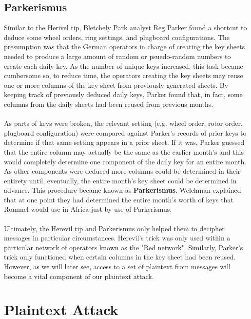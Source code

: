 \subsection{Parkerismus}
Similar to the Herivel tip, Bletchely Park analyst Reg Parker found a
shortcut to deduce some wheel orders, ring settings, and plugboard
configurations. The presumption was that the German operators in
charge of creating the key sheets needed to produce a large amount of
random or psuedo-random numbers to create each daily key. As the
number of unique keys increased, this task became cumbersome so, to
reduce time, the operators creating the key sheets may reuse one or
more columns of the key sheet from previously generated sheets. By
keeping track of previously deduced daily keys, Parker found that, in
fact, some columns from the daily sheets had been reused from
previous months.
\\\\As parts of keys were broken, the relevant setting
(e.g. wheel order, rotor order, plugboard configuration) were compared
against Parker's records of prior keys to determine if that same
setting appears in a prior sheet. If it was, Parker guessed that the
entire column may actually be the same as the earlier month's and
this would completely determine one component of the daily key for an
entire month. As other components were deduced more columns could be
determined in their entirety until, eventually, the entire month's
key sheet could be determined in advance. This procedure became known
as {\bf{Parkerismus}}. Welchman explained that at one point they had
determined the entire month's worth of keys that Rommel would use in
Africa just by use of Parkerismus.
\\\\Ultimately, the Herevil tip and Parkerismus only helped them to
decipher messages in particular circumstances. Herevil's trick was
only used within a
particular network of operators known as the "Red network". Similarly,
Parker's trick only functioned when certain columns in the key sheet
had been reused. However,
as we will later see, access to a set of plaintext from messages will
become a vital component of our plaintext attack.

\section{Plaintext Attack}

